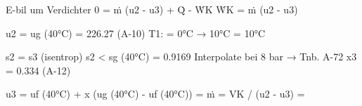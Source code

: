 E-bil um Verdichter  
0 = ṁ (u2 - u3) + Q̇ - ẆK  
ẆK = ṁ (u2 - u3)  

u2 = ug (40°C) = 226.27 (A-10)  
T1: = 0°C → 10°C = 10°C  

s2 = s3 (isentrop)  
s2 < sg (40°C) = 0.9169  
Interpolate bei 8 bar → Tnb. A-72  
x3 = 0.334 (A-12)  

u3 = uf (40°C) + x (ug (40°C) - uf (40°C)) =  
ṁ = VK / (u2 - u3) =